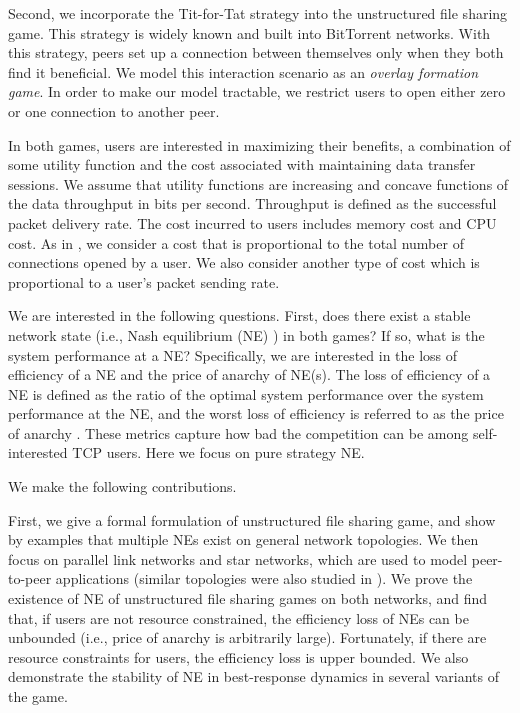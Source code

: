 \documentclass[conference]{IEEEtran}
\begin{document}
Second, we incorporate the Tit-for-Tat strategy into the
unstructured file sharing game. This strategy is widely known and
built into BitTorrent \cite{bt} networks. With this strategy,
peers set up a connection between themselves only when they both
find it beneficial. We model this interaction scenario as an
\textit{overlay formation game}. In order to make our model
tractable, we restrict users to open either zero or one connection
to another peer.

In both games, users are interested in maximizing their benefits,
a combination of some utility function and the cost associated
with maintaining data transfer sessions. We assume that utility
functions are increasing and concave functions of the data
throughput in bits per second. Throughput is defined as the
successful packet delivery rate. The cost incurred to users
includes memory cost and CPU cost. As in
\cite{zhang05tcpgame_icnp}, we consider a cost that is
proportional to the total number of connections opened by a user.
We also consider another type of cost which is proportional to a
user's packet sending rate.

We are interested in the following questions. First, does there
exist a stable network state (i.e., Nash equilibrium (NE)
\cite{basar98game}) in both games?  If so, what is the system
performance at a NE? Specifically, we are interested in the loss
of efficiency of a NE and the price of anarchy
\cite{koutsoupias99worstcase} of NE(s). The loss of efficiency of
a NE is defined as the ratio of the optimal system performance
over the system performance at the NE, and the worst loss of
efficiency is referred to as the price of anarchy
\cite{koutsoupias99worstcase}. These metrics capture how bad the
competition can be among self-interested TCP users. Here we focus
on pure strategy NE.

We make the following contributions.

First, we give a formal formulation of unstructured file sharing
game, and show by examples that multiple NEs exist on general
network topologies. We then focus on parallel link networks and
star networks, which are used to model peer-to-peer applications
(similar topologies were also studied in
\cite{qiu04bt}\cite{piccolo04p2p}). We prove the existence of NE
of unstructured file sharing games on both networks, and find
that, if users are not resource constrained, the efficiency loss
of NEs can be unbounded (i.e., price of anarchy is arbitrarily
large). Fortunately, if there are resource constraints for users,
the efficiency loss is upper bounded. We also demonstrate the
stability of NE in best-response dynamics in several variants of
the game.
\end{document}
